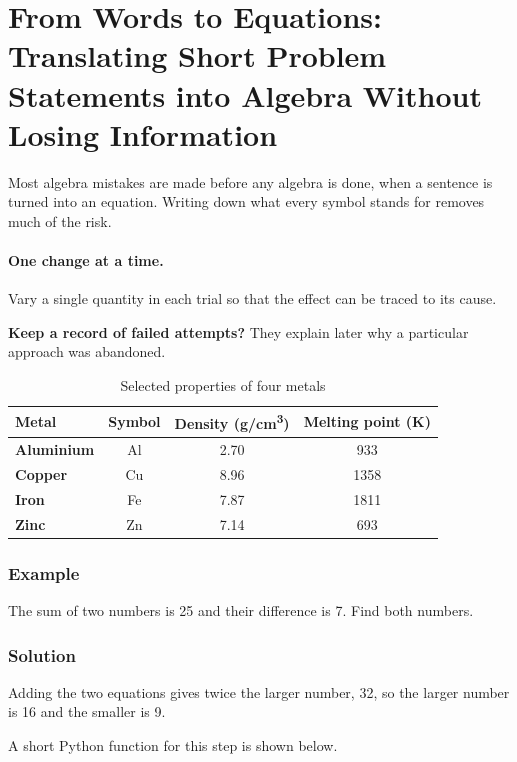 \documentclass[11pt]{article}
\begin{document}
\section{From Words to Equations: Translating Short Problem Statements into Algebra Without Losing Information}

Most algebra mistakes are made before any algebra is done, when a sentence is turned into an equation. Writing down what every symbol stands for removes much of the risk.

\paragraph{One change at a time.} Vary a single quantity in each trial so that the effect can be traced to its cause.

\textbf{Keep a record of failed attempts?} They explain later why a particular approach was abandoned.

\begin{table}[H]
\centering
\caption{Selected properties of four metals}
\begin{tabular}{lccc}
\toprule
\textbf{Metal} & \textbf{Symbol} & \textbf{Density (g/cm\textsuperscript{3})} & \textbf{Melting point (K)} \\
\midrule
\textbf{Aluminium} & Al & 2.70 & 933 \\
\textbf{Copper} & Cu & 8.96 & 1358 \\
\textbf{Iron} & Fe & 7.87 & 1811 \\
\textbf{Zinc} & Zn & 7.14 & 693 \\
\bottomrule
\end{tabular}
\end{table}

\subsubsection*{Example}

The sum of two numbers is 25 and their difference is 7. Find both numbers.

\subsubsection*{Solution}

Adding the two equations gives twice the larger number, 32, so the larger number is 16 and the smaller is 9.

A short Python function for this step is shown below.
\end{document}
